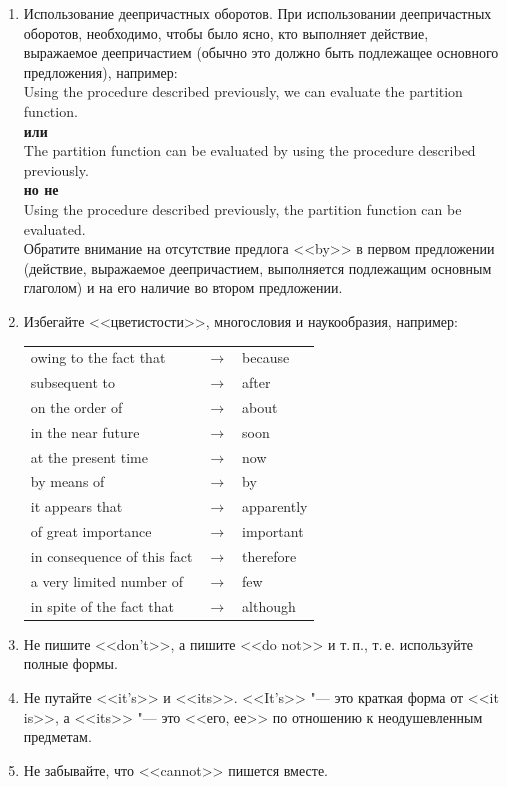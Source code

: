\documentclass[a5paper, 10pt, twoside, numbers=enddot]{scrartcl}
\newcommand{\ie}{т.\,е.\xspace}
\begin{document}
\begin{enumerate}
  \item Использование деепричастных оборотов. При использовании деепричастных оборотов, необходимо,
    чтобы было ясно, кто выполняет действие, выражаемое деепричастием (обычно это должно быть
    подлежащее основного предложения), например:\\ [4pt]
    \textsf{
      Using the procedure described previously, we can evaluate the partition function.\\ [4pt]
      \textbf{или}\\ [4pt]
      The partition function can be evaluated by using the procedure described previously.\\ [4pt]
      \textbf{но не}\\ [4pt]
      Using the procedure described previously, the partition function can be evaluated.\\ [4pt]
    }
    Обратите внимание на отсутствие предлога <<by>> в первом предложении (действие, выражаемое
    деепричастием, выполняется подлежащим основным глаголом) и на его наличие во втором предложении.

  \item Избегайте <<цветистости>>, многословия и наукообразия, например:
    \begin{center}
      \sffamily
      \begin{tabular}{lll}
        owing to the fact that      & $\rightarrow$ & because\\
        subsequent to               & $\rightarrow$ & after\\
        on the order of             & $\rightarrow$ & about\\
        in the near future          & $\rightarrow$ & soon\\
        at the present time         & $\rightarrow$ & now\\
        by means of                 & $\rightarrow$ & by\\
        it appears that             & $\rightarrow$ & apparently\\
        of great importance         & $\rightarrow$ & important\\
        in consequence of this fact & $\rightarrow$ & therefore\\
        a very limited number of    & $\rightarrow$ & few\\
        in spite of the fact that   & $\rightarrow$ & although
      \end{tabular}
    \end{center}

  \item Не пишите <<don't>>, а пишите <<do not>> и т.\,п., \ie используйте полные формы.

  \item Не путайте <<it's>> и <<its>>. <<It's>> "--- это краткая форма от <<it is>>, а <<its>> "---
    это <<его, ее>> по отношению к неодушевленным предметам.

  \item Не забывайте, что <<cannot>> пишется вместе.
\end{enumerate}
\end{document}

